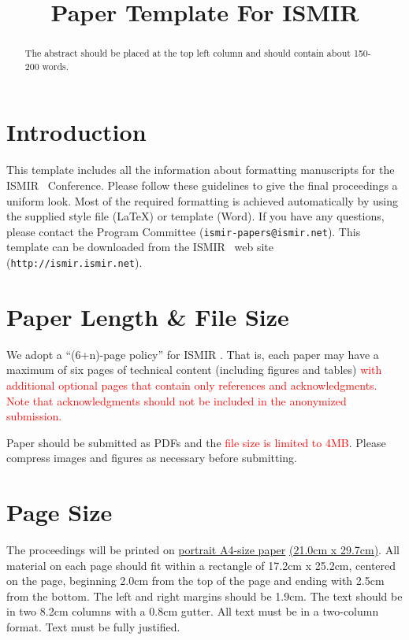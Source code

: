 \documentclass{article}
\title{Paper Template For ISMIR \conferenceyear}
\begin{document}
%
\maketitle
%
\begin{abstract}
The abstract should be placed at the top left column and should contain about 150-200 words.
\end{abstract}
%
\section{Introduction}\label{sec:introduction}

This template includes all the information about formatting manuscripts for the ISMIR \conferenceyear\ Conference.
Please follow these guidelines to give the final proceedings a uniform look.
Most of the required formatting is achieved automatically by using the supplied
style file (\LaTeX) or template (Word).
If you have any questions, please contact the Program Committee (\texttt{ismir\conferenceyear-papers@ismir.net}).
This template can be downloaded from the ISMIR \conferenceyear\ web site (\texttt{http://ismir\conferenceyear.ismir.net}).
%
\section{Paper Length \& File Size}
We adopt a ``(6+n)-page policy'' for ISMIR \conferenceyear. That is, each paper may have a maximum of six pages of technical content (including figures and tables) \textcolor{red}{with additional optional pages that contain only references and acknowledgments. Note that acknowledgments should not be included in the anonymized submission.}

Paper should be submitted as PDFs and the \textcolor{red}{file size is limited to 4MB}. Please compress images and figures as necessary before submitting.

\section{Page Size}\label{sec:page_size}

The proceedings will be printed on
 \underline{portrait A4-size paper} \underline{(21.0cm x 29.7cm)}.
All material on each page should fit within a rectangle of 17.2cm x 25.2cm,
centered on the page, beginning 2.0cm
from the top of the page and ending with 2.5cm from the bottom.
The left and right margins should be 1.9cm.
The text should be in two 8.2cm columns with a 0.8cm gutter.
All text must be in a two-column format.
Text must be fully justified.
\end{document}
